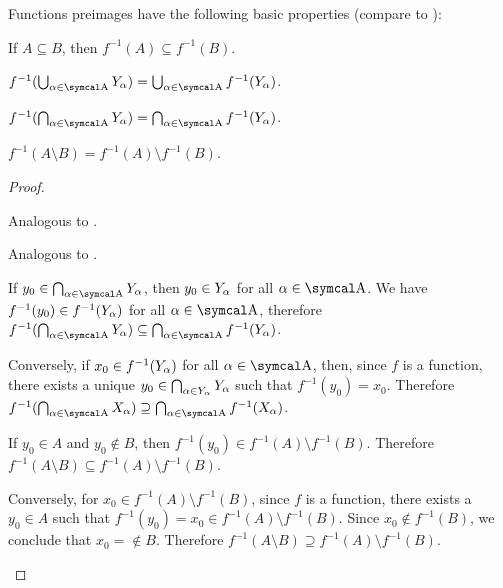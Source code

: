 \begin{proposition}\label{thm:function_preimage_properties}
  Functions preimages have the following basic properties (compare to ):
  \begin{propenum}
     If \( A \subseteq B \), then \( f^{-1}(A) \subseteq f^{-1}(B) \).

     \( f^{-1}(\bigcup_{\al \in \CA} Y_\al) = \bigcup_{\al \in \CA} f^{-1}(Y_\al) \).

     \( f^{-1}(\bigcap_{\al \in \CA} Y_\al) = \bigcap_{\al \in \CA} f^{-1}(Y_\al) \).

     \( f^{-1}(A \setminus B) = f^{-1}(A) \setminus f^{-1}(B) \).
  \end{propenum}
\end{proposition}
\begin{proof}\mbox{}
  \begin{propenum}
     Analogous to .

     Analogous to .

     If \( y_0 \in \bigcap_{\al \in \CA} Y_{\al} \), then \( y_0 \in Y_\alpha \) for all \( \al \in \CA \). We have \( f^{-1}(y_0) \in f^{-1}(Y_\alpha) \) for all \( \al \in \CA \), therefore \( f^{-1}(\bigcap_{\al \in \CA} Y_\al) \subseteq \bigcap_{\al \in \CA} f^{-1}(Y_\al) \).

    Conversely, if \( x_0 \in f^{-1}(Y_\alpha) \) for all \( \al \in \CA \), then, since \( f \) is a function, there exists a unique \( y_0 \in \bigcap_{\alpha \in Y_\alpha}Y_\alpha \) such that \( f^{-1}(y_0) = x_0 \). Therefore \( f^{-1}(\bigcap_{\al \in \CA} X_\al) \supseteq \bigcap_{\al \in \CA} f^{-1}(X_\al) \).

     If \( y_0 \in A \) and \( y_0 \not\in B \), then \( f^{-1}(y_0) \in f^{-1}(A) \setminus f^{-1}(B) \). Therefore \( f^{-1}(A \setminus B) \subseteq f^{-1}(A) \setminus f^{-1}(B) \).

    Conversely, for \( x_0 \in f^{-1}(A) \setminus f^{-1}(B) \), since \( f \) is a function, there exists a \( y_0 \in A \) such that \( f^{-1}(y_0) = x_0 \in f^{-1}(A) \setminus f^{-1}(B) \). Since \( x_0 \not\in f^{-1}(B) \), we conclude that \( x_0 = \not\in B \). Therefore \( f^{-1}(A \setminus B) \supseteq f^{-1}(A) \setminus f^{-1}(B) \).
  \end{propenum}
\end{proof}

